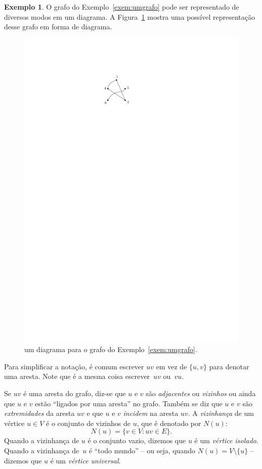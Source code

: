 \documentclass[12pt, a4paper]{article}
\theoremstyle{definition}
\newtheorem{exem}[teor]{Exemplo}
\begin{document}
\begin{exem}
O grafo do Exemplo~\ref{exem:umgrafo} pode ser representado de diversos modos em um diagrama. A Figura~\ref{fig:umgrafo} mostra uma possível representação desse grafo em forma de diagrama.
\begin{figure}
    \centering
    \includegraphics{umgrafo.pdf}
    \caption{um diagrama para o grafo do Exemplo~\ref{exem:umgrafo}.}
    \label{fig:umgrafo}
\end{figure}
\end{exem}

Para simplificar a notação, é comum escrever $uv$ em vez de $\{u,v\}$ para denotar uma aresta. Note que é a mesma coisa escrever~$uv$ ou~$vu$.

Se $uv$ é uma aresta do grafo, diz-se que $u$ e $v$ são \emph{adjacentes} ou \emph{vizinhos} ou ainda que $u$ e $v$ estão ``ligados por uma aresta'' no grafo. Também se diz que $u$ e $v$ são \emph{extremidades} da aresta $uv$ e que $u$ e $v$ \emph{incidem} na aresta $uv$.  A \emph{vizinhança} de um vértice $u \in V$ é o conjunto de vizinhos de $u$, que é denotado por $N(u)$:
\[ N(u) = \{v \in V \colon uv \in E\}. \]
Quando a vizinhança de $u$ é o conjunto vazio, dizemos que $u$ é um \emph{vértice isolado}. Quando a vizinhança de~$u$ é ``todo mundo'' -- ou seja, quando $N(u) = V \setminus \{u\}$ -- dizemos que $u$ é um \emph{vértice universal}.
\end{document}

